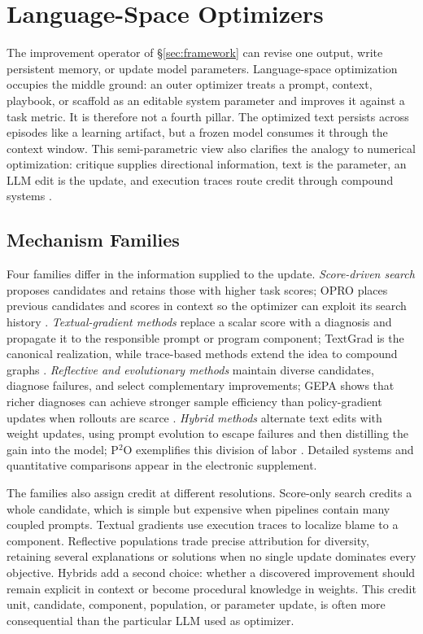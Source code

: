 \section{Language-Space Optimizers}
\label{sec:optimizers}

The improvement operator of \S\ref{sec:framework} can revise one output, write persistent memory, or update model parameters. Language-space optimization occupies the middle ground: an outer optimizer treats a prompt, context, playbook, or scaffold as an editable system parameter and improves it against a task metric. It is therefore not a fourth pillar. The optimized text persists across episodes like a learning artifact, but a frozen model consumes it through the context window. This semi-parametric view also clarifies the analogy to numerical optimization: critique supplies directional information, text is the parameter, an LLM edit is the update, and execution traces route credit through compound systems \citep{xiao2024verbalized,cheng2024trace}.

\subsection{Mechanism Families}
\label{subsec:optimizers-search}

Four families differ in the information supplied to the update. \emph{Score-driven search} proposes candidates and retains those with higher task scores; OPRO places previous candidates and scores in context so the optimizer can exploit its search history \citep{yang2024opro}. \emph{Textual-gradient methods} replace a scalar score with a diagnosis and propagate it to the responsible prompt or program component; TextGrad is the canonical realization, while trace-based methods extend the idea to compound graphs \citep{yuksekgonul2024textgrad}. \emph{Reflective and evolutionary methods} maintain diverse candidates, diagnose failures, and select complementary improvements; GEPA shows that richer diagnoses can achieve stronger sample efficiency than policy-gradient updates when rollouts are scarce \citep{agrawal2026gepa}. \emph{Hybrid methods} alternate text edits with weight updates, using prompt evolution to escape failures and then distilling the gain into the model; P$^2$O exemplifies this division of labor \citep{lu2026p2o}. Detailed systems and quantitative comparisons appear in the electronic supplement.

The families also assign credit at different resolutions. Score-only search credits a whole candidate, which is simple but expensive when pipelines contain many coupled prompts. Textual gradients use execution traces to localize blame to a component. Reflective populations trade precise attribution for diversity, retaining several explanations or solutions when no single update dominates every objective. Hybrids add a second choice: whether a discovered improvement should remain explicit in context or become procedural knowledge in weights. This credit unit, candidate, component, population, or parameter update, is often more consequential than the particular LLM used as optimizer.

